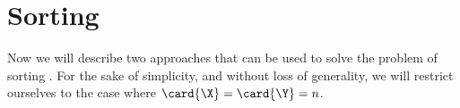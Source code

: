 \chapter{Sorting \XY}

Now we will describe two approaches that can be used to solve the problem
of sorting \XY. For the sake of simplicity, and without loss of generality,
we will restrict ourselves to the case where $\card{\X} = \card{\Y} = n$.
